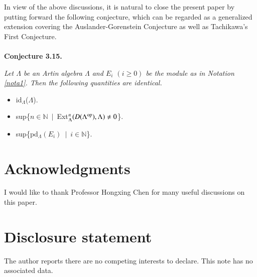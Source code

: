 \documentclass[11pt,a4paper]{article}
\begin{document}
 In view of the above discussions, it is natural to close the present paper by putting forward the following conjecture,
  which can be regarded as a   generalized extension covering the Auslander-Gorenstein Conjecture as well as   Tachikawa's First Conjecture.
  \\
\\
{\bf Conjecture 3.15.} {\it Let  $\Lambda$ be an Artin algebra $\Lambda$ and  $ E_{i} $  $(i \geq 0)$ be the module as in  {\rm Notation \ref{nota1}}.
 Then the following quantities are identical.
\begin{itemize}
\item[$(1)$]  {\rm id$_{\Lambda}$($\Lambda$)}.
 \item[$(2)$]  {\rm sup\{$n \in \mathbb{N}$\ $|$\   Ext$_{\Lambda}^{n}(D(\Lambda^{{\rm op}}), \Lambda) \neq  0$\}}.
 \item[$(3)$]  {\rm sup\{pd$_{\Lambda}$$(E_{i})$\ $|$\ $i \in \mathbb{N}$\}}.\end{itemize}}


\section*{Acknowledgments}


I would like to thank Professor Hongxing Chen for many useful discussions on this paper.

\section*{Disclosure statement}
The author reports there are no competing interests to declare. This note has no associated data.

   \vskip3mm
\end{document}
